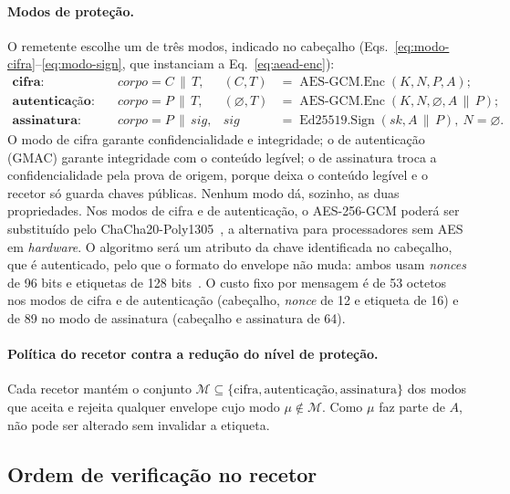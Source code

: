 \paragraph{Modos de proteção.} O remetente escolhe um de três modos, indicado no
cabeçalho (Eqs.~\eqref{eq:modo-cifra}--\eqref{eq:modo-sign}, que instanciam a
Eq.~\eqref{eq:aead-enc}):
\begin{align}
  \textbf{cifra:}\quad & \mathit{corpo} = C \,\|\, T, & (C, T) &= \operatorname{AES\text{-}GCM.Enc}(K, N, P, A); \label{eq:modo-cifra}\\
  \textbf{autenticação:}\quad & \mathit{corpo} = P \,\|\, T, & (\varnothing, T) &= \operatorname{AES\text{-}GCM.Enc}(K, N, \varnothing, A \,\|\, P); \label{eq:modo-auth}\\
  \textbf{assinatura:}\quad & \mathit{corpo} = P \,\|\, \mathit{sig}, & \mathit{sig} &= \operatorname{Ed25519.Sign}(\mathit{sk}, A \,\|\, P),\ N = \varnothing. \label{eq:modo-sign}
\end{align}
O modo de cifra garante confidencialidade e integridade; o de autenticação (GMAC)
garante integridade com o conteúdo legível; o de assinatura troca a
confidencialidade pela prova de origem, porque deixa o conteúdo legível e o recetor
só guarda chaves públicas. Nenhum modo dá, sozinho, as duas propriedades. Nos modos de cifra e de
autenticação, o AES-256-GCM poderá ser substituído pelo
ChaCha20-Poly1305~\cite[§2.8]{rfc8439}, a alternativa para processadores sem AES
em \emph{hardware}. O algoritmo será um atributo da chave identificada no
cabeçalho, que é autenticado, pelo que o formato do envelope não muda: ambos usam
\emph{nonces} de 96 bits e etiquetas de 128 bits~\cite[§2.5, §2.8]{rfc8439}. O custo fixo
por mensagem é de 53 octetos nos modos de cifra e de autenticação (cabeçalho, \emph{nonce}
de 12 e etiqueta de 16) e de 89 no modo de assinatura (cabeçalho e assinatura de 64).

\paragraph{Política do recetor contra a redução do nível de proteção.} Cada recetor
mantém o conjunto $\mathcal{M} \subseteq \{\text{cifra}, \text{autenticação},
\text{assinatura}\}$ dos modos que aceita e rejeita qualquer envelope cujo modo
$\mu \notin \mathcal{M}$. Como $\mu$ faz parte de $A$, não pode ser alterado sem
invalidar a etiqueta.

\subsection{Ordem de verificação no recetor}
\label{sec:ordem}

